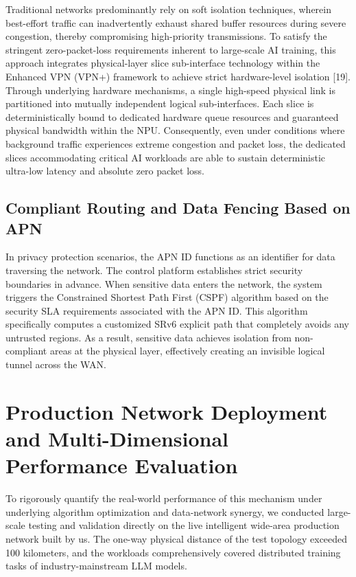 \documentclass[a4paper]{jpconf}
\begin{document}
Traditional networks predominantly rely on soft isolation techniques, wherein best-effort traffic can inadvertently exhaust shared buffer resources during severe congestion, thereby compromising high-priority transmissions. To satisfy the stringent zero-packet-loss requirements inherent to large-scale AI training, this approach integrates physical-layer slice sub-interface technology within the Enhanced VPN (VPN+) framework to achieve strict hardware-level isolation [19]. Through underlying hardware mechanisms, a single high-speed physical link is partitioned into mutually independent logical sub-interfaces. Each slice is deterministically bound to dedicated hardware queue resources and guaranteed physical bandwidth within the NPU. Consequently, even under conditions where background traffic experiences extreme congestion and packet loss, the dedicated slices accommodating critical AI workloads are able to sustain deterministic ultra-low latency and absolute zero packet loss.


\subsection{Compliant Routing and Data Fencing Based on APN}


In privacy protection scenarios, the APN ID functions as an identifier for data traversing the network. The control platform establishes strict security boundaries in advance. When sensitive data enters the network, the system triggers the Constrained Shortest Path First (CSPF) algorithm based on the security SLA requirements associated with the APN ID. This algorithm specifically computes a customized SRv6 explicit path that completely avoids any untrusted regions. As a result, sensitive data achieves isolation from non-compliant areas at the physical layer, effectively creating an invisible logical tunnel across the WAN.


\section{Production Network Deployment and Multi-Dimensional Performance Evaluation}


To rigorously quantify the real-world performance of this mechanism under underlying algorithm optimization and data-network synergy, we conducted large-scale testing and validation directly on the live intelligent wide-area production network built by us. The one-way physical distance of the test topology exceeded 100 kilometers, and the workloads comprehensively covered distributed training tasks of industry-mainstream LLM models.
\end{document}
